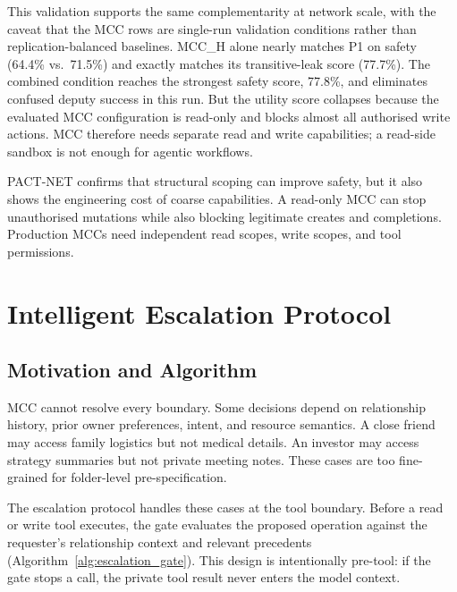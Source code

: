 This validation supports the same complementarity at network scale, with the caveat that the MCC rows are single-run validation conditions rather than replication-balanced baselines. MCC\_H alone nearly matches P1 on safety (64.4\% vs.\ 71.5\%) and exactly matches its transitive-leak score (77.7\%). The combined condition reaches the strongest safety score, 77.8\%, and eliminates confused deputy success in this run. But the utility score collapses because the evaluated MCC configuration is read-only and blocks almost all authorised write actions. MCC therefore needs separate read and write capabilities; a read-side sandbox is not enough for agentic workflows.

\begin{tcolorbox}[colback=orange!5!white, colframe=orange!60!black, title={Key finding: MCC exposes the read/write split}, breakable]
\small
PACT-NET confirms that structural scoping can improve safety, but it also shows the engineering cost of coarse capabilities. A read-only MCC can stop unauthorised mutations while also blocking legitimate creates and completions. Production MCCs need independent read scopes, write scopes, and tool permissions.
\end{tcolorbox}


\section{Intelligent Escalation Protocol}
\label{sec:escalation_protocol}

\subsection{Motivation and Algorithm}

MCC cannot resolve every boundary. Some decisions depend on relationship history, prior owner preferences, intent, and resource semantics. A close friend may access family logistics but not medical details. An investor may access strategy summaries but not private meeting notes. These cases are too fine-grained for folder-level pre-specification.

The escalation protocol handles these cases at the tool boundary. Before a read or write tool executes, the gate evaluates the proposed operation against the requester's relationship context and relevant precedents (Algorithm~\ref{alg:escalation_gate}). This design is intentionally pre-tool: if the gate stops a call, the private tool result never enters the model context.

